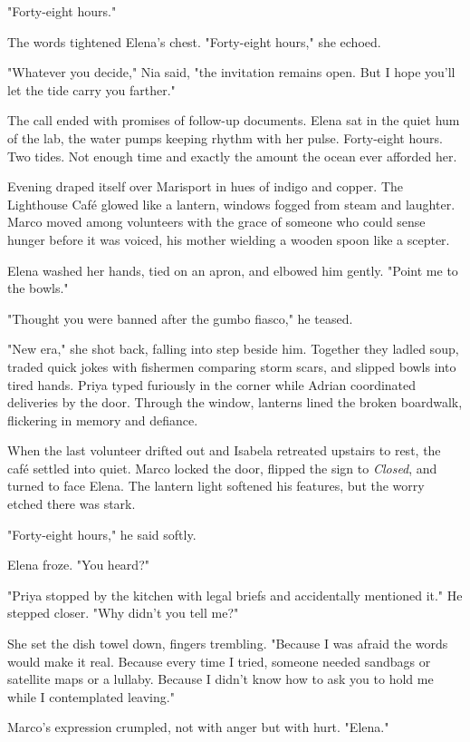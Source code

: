 "Forty-eight hours."

The words tightened Elena's chest. "Forty-eight hours," she echoed.

"Whatever you decide," Nia said, "the invitation remains open. But I hope you'll let the tide carry you farther."

The call ended with promises of follow-up documents. Elena sat in the quiet hum of the lab, the water pumps keeping rhythm with her pulse. Forty-eight hours. Two tides. Not enough time and exactly the amount the ocean ever afforded her.

\bigskip

Evening draped itself over Marisport in hues of indigo and copper. The Lighthouse Café glowed like a lantern, windows fogged from steam and laughter. Marco moved among volunteers with the grace of someone who could sense hunger before it was voiced, his mother wielding a wooden spoon like a scepter.

Elena washed her hands, tied on an apron, and elbowed him gently. "Point me to the bowls."

"Thought you were banned after the gumbo fiasco," he teased.

"New era," she shot back, falling into step beside him. Together they ladled soup, traded quick jokes with fishermen comparing storm scars, and slipped bowls into tired hands. Priya typed furiously in the corner while Adrian coordinated deliveries by the door. Through the window, lanterns lined the broken boardwalk, flickering in memory and defiance.

When the last volunteer drifted out and Isabela retreated upstairs to rest, the café settled into quiet. Marco locked the door, flipped the sign to \textit{Closed}, and turned to face Elena. The lantern light softened his features, but the worry etched there was stark.

"Forty-eight hours," he said softly.

Elena froze. "You heard?"

"Priya stopped by the kitchen with legal briefs and accidentally mentioned it." He stepped closer. "Why didn't you tell me?"

She set the dish towel down, fingers trembling. "Because I was afraid the words would make it real. Because every time I tried, someone needed sandbags or satellite maps or a lullaby. Because I didn't know how to ask you to hold me while I contemplated leaving."

Marco's expression crumpled, not with anger but with hurt. "Elena."

